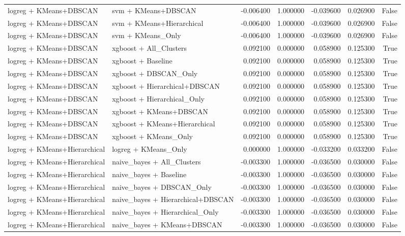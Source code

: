 \begin{tabular}{llrrrrr}
logreg + KMeans+DBSCAN & svm + KMeans+DBSCAN & -0.006400 & 1.000000 & -0.039600 & 0.026900 & False \\
logreg + KMeans+DBSCAN & svm + KMeans+Hierarchical & -0.006400 & 1.000000 & -0.039600 & 0.026900 & False \\
logreg + KMeans+DBSCAN & svm + KMeans_Only & -0.006400 & 1.000000 & -0.039600 & 0.026900 & False \\
logreg + KMeans+DBSCAN & xgboost + All_Clusters & 0.092100 & 0.000000 & 0.058900 & 0.125300 & True \\
logreg + KMeans+DBSCAN & xgboost + Baseline & 0.092100 & 0.000000 & 0.058900 & 0.125300 & True \\
logreg + KMeans+DBSCAN & xgboost + DBSCAN_Only & 0.092100 & 0.000000 & 0.058900 & 0.125300 & True \\
logreg + KMeans+DBSCAN & xgboost + Hierarchical+DBSCAN & 0.092100 & 0.000000 & 0.058900 & 0.125300 & True \\
logreg + KMeans+DBSCAN & xgboost + Hierarchical_Only & 0.092100 & 0.000000 & 0.058900 & 0.125300 & True \\
logreg + KMeans+DBSCAN & xgboost + KMeans+DBSCAN & 0.092100 & 0.000000 & 0.058900 & 0.125300 & True \\
logreg + KMeans+DBSCAN & xgboost + KMeans+Hierarchical & 0.092100 & 0.000000 & 0.058900 & 0.125300 & True \\
logreg + KMeans+DBSCAN & xgboost + KMeans_Only & 0.092100 & 0.000000 & 0.058900 & 0.125300 & True \\
logreg + KMeans+Hierarchical & logreg + KMeans_Only & 0.000000 & 1.000000 & -0.033200 & 0.033200 & False \\
logreg + KMeans+Hierarchical & naive_bayes + All_Clusters & -0.003300 & 1.000000 & -0.036500 & 0.030000 & False \\
logreg + KMeans+Hierarchical & naive_bayes + Baseline & -0.003300 & 1.000000 & -0.036500 & 0.030000 & False \\
logreg + KMeans+Hierarchical & naive_bayes + DBSCAN_Only & -0.003300 & 1.000000 & -0.036500 & 0.030000 & False \\
logreg + KMeans+Hierarchical & naive_bayes + Hierarchical+DBSCAN & -0.003300 & 1.000000 & -0.036500 & 0.030000 & False \\
logreg + KMeans+Hierarchical & naive_bayes + Hierarchical_Only & -0.003300 & 1.000000 & -0.036500 & 0.030000 & False \\
logreg + KMeans+Hierarchical & naive_bayes + KMeans+DBSCAN & -0.003300 & 1.000000 & -0.036500 & 0.030000 & False \\

\end{tabular}
